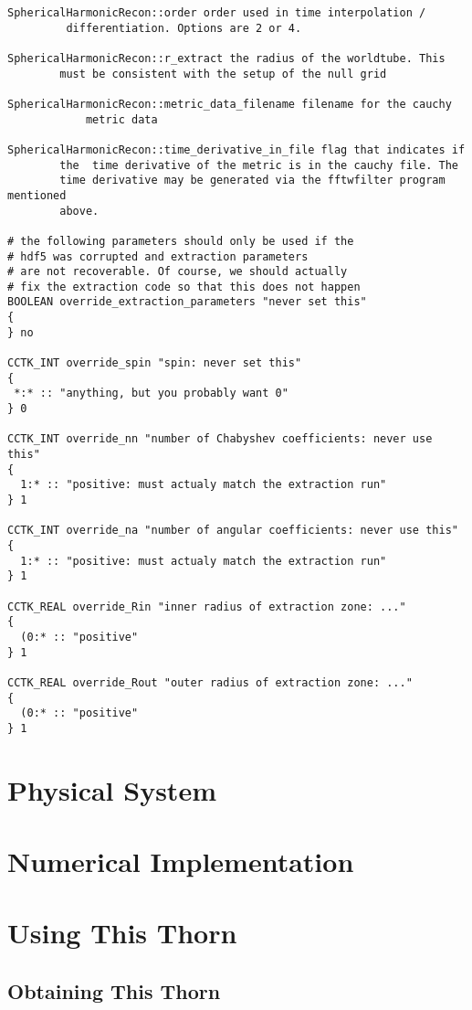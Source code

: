 \begin{verbatim}
SphericalHarmonicRecon::order order used in time interpolation /
         differentiation. Options are 2 or 4.

SphericalHarmonicRecon::r_extract the radius of the worldtube. This
        must be consistent with the setup of the null grid

SphericalHarmonicRecon::metric_data_filename filename for the cauchy 
            metric data

SphericalHarmonicRecon::time_derivative_in_file flag that indicates if
        the  time derivative of the metric is in the cauchy file. The
        time derivative may be generated via the fftwfilter program mentioned
        above.

# the following parameters should only be used if the
# hdf5 was corrupted and extraction parameters
# are not recoverable. Of course, we should actually
# fix the extraction code so that this does not happen
BOOLEAN override_extraction_parameters "never set this"
{
} no

CCTK_INT override_spin "spin: never set this"
{
 *:* :: "anything, but you probably want 0"
} 0

CCTK_INT override_nn "number of Chabyshev coefficients: never use this"
{
  1:* :: "positive: must actualy match the extraction run"
} 1

CCTK_INT override_na "number of angular coefficients: never use this"
{
  1:* :: "positive: must actualy match the extraction run"
} 1

CCTK_REAL override_Rin "inner radius of extraction zone: ..."
{
  (0:* :: "positive"
} 1

CCTK_REAL override_Rout "outer radius of extraction zone: ..."
{
  (0:* :: "positive"
} 1
\end{verbatim}

\section{Physical System}

\section{Numerical Implementation}

\section{Using This Thorn}

\subsection{Obtaining This Thorn}


